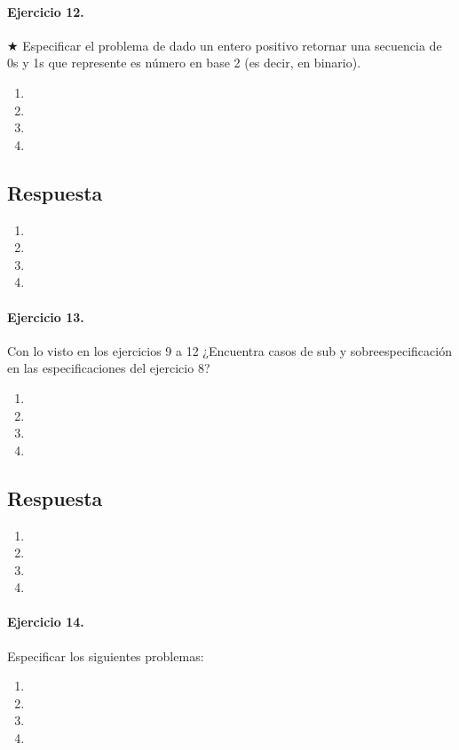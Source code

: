 \documentclass[a4paper]{article}
\begin{document}
\paragraph*{Ejercicio 12.}$\bigstar$ Especificar el problema de dado un entero positivo retornar una secuencia de 0s y 1s que represente es número en base 2 (es decir, en binario).
	\begin{enumerate}[label=\alph*)]
		\item
		\item
		\item
		\item
	\end{enumerate}
\subsection*{Respuesta}
	\begin{enumerate}[label=\alph*)]
		\item
		\item
		\item
		\item
	\end{enumerate}

\paragraph*{Ejercicio 13.} Con lo visto en los ejercicios 9 a 12 ¿Encuentra casos de sub y sobreespecificación en las especificaciones del ejercicio 8?
	\begin{enumerate}[label=\alph*)]
		\item
		\item
		\item
		\item
	\end{enumerate}
\subsection*{Respuesta}
	\begin{enumerate}[label=\alph*)]
		\item
		\item
		\item
		\item
	\end{enumerate}
	
\paragraph*{Ejercicio 14.} Especificar los siguientes problemas:
	\begin{enumerate}[label=\alph*)]
		\item
		\item
		\item
		\item
	\end{enumerate}
\end{document}

